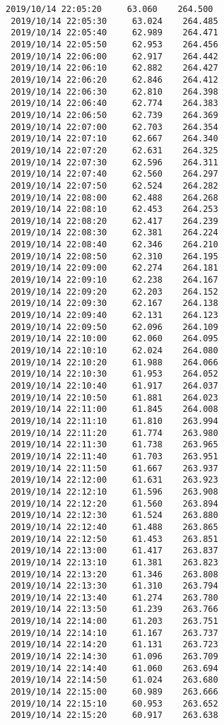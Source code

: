 \documentclass[11pt]{article}
\begin{document}
\begin{Verbatim}[commandchars=\\\{\}]
 2019/10/14 22:05:20     63.060    264.500
 2019/10/14 22:05:30     63.024    264.485
 2019/10/14 22:05:40     62.989    264.471
 2019/10/14 22:05:50     62.953    264.456
 2019/10/14 22:06:00     62.917    264.442
 2019/10/14 22:06:10     62.882    264.427
 2019/10/14 22:06:20     62.846    264.412
 2019/10/14 22:06:30     62.810    264.398
 2019/10/14 22:06:40     62.774    264.383
 2019/10/14 22:06:50     62.739    264.369
 2019/10/14 22:07:00     62.703    264.354
 2019/10/14 22:07:10     62.667    264.340
 2019/10/14 22:07:20     62.631    264.325
 2019/10/14 22:07:30     62.596    264.311
 2019/10/14 22:07:40     62.560    264.297
 2019/10/14 22:07:50     62.524    264.282
 2019/10/14 22:08:00     62.488    264.268
 2019/10/14 22:08:10     62.453    264.253
 2019/10/14 22:08:20     62.417    264.239
 2019/10/14 22:08:30     62.381    264.224
 2019/10/14 22:08:40     62.346    264.210
 2019/10/14 22:08:50     62.310    264.195
 2019/10/14 22:09:00     62.274    264.181
 2019/10/14 22:09:10     62.238    264.167
 2019/10/14 22:09:20     62.203    264.152
 2019/10/14 22:09:30     62.167    264.138
 2019/10/14 22:09:40     62.131    264.123
 2019/10/14 22:09:50     62.096    264.109
 2019/10/14 22:10:00     62.060    264.095
 2019/10/14 22:10:10     62.024    264.080
 2019/10/14 22:10:20     61.988    264.066
 2019/10/14 22:10:30     61.953    264.052
 2019/10/14 22:10:40     61.917    264.037
 2019/10/14 22:10:50     61.881    264.023
 2019/10/14 22:11:00     61.845    264.008
 2019/10/14 22:11:10     61.810    263.994
 2019/10/14 22:11:20     61.774    263.980
 2019/10/14 22:11:30     61.738    263.965
 2019/10/14 22:11:40     61.703    263.951
 2019/10/14 22:11:50     61.667    263.937
 2019/10/14 22:12:00     61.631    263.923
 2019/10/14 22:12:10     61.596    263.908
 2019/10/14 22:12:20     61.560    263.894
 2019/10/14 22:12:30     61.524    263.880
 2019/10/14 22:12:40     61.488    263.865
 2019/10/14 22:12:50     61.453    263.851
 2019/10/14 22:13:00     61.417    263.837
 2019/10/14 22:13:10     61.381    263.823
 2019/10/14 22:13:20     61.346    263.808
 2019/10/14 22:13:30     61.310    263.794
 2019/10/14 22:13:40     61.274    263.780
 2019/10/14 22:13:50     61.239    263.766
 2019/10/14 22:14:00     61.203    263.751
 2019/10/14 22:14:10     61.167    263.737
 2019/10/14 22:14:20     61.131    263.723
 2019/10/14 22:14:30     61.096    263.709
 2019/10/14 22:14:40     61.060    263.694
 2019/10/14 22:14:50     61.024    263.680
 2019/10/14 22:15:00     60.989    263.666
 2019/10/14 22:15:10     60.953    263.652
 2019/10/14 22:15:20     60.917    263.638

\end{Verbatim}
\end{document}
